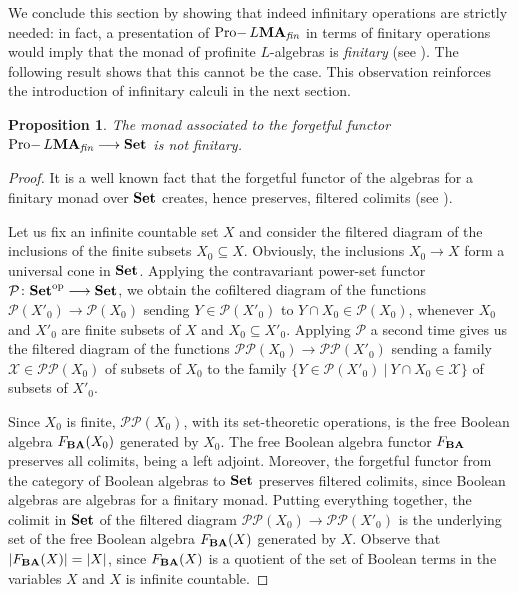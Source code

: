 \documentclass{article}
\newtheorem{prop}{Proposition}
\theoremstyle{definition}
\DeclareMathOperator{\Pro}{Pro-}
\newcommand{\MA}{\textup{\textbf{MA}}}
\newcommand{\BA}{\textup{\textbf{BA}}}
\newcommand{\fin}{\textit{fin}}
\newcommand{\op}{\textup{op}}
\newcommand{\Set}{\textup{\textbf{Set}}}
\begin{document}
We conclude this section by showing that indeed infinitary operations are strictly needed: in fact, a presentation of $\Pro L\MA_\fin$ in terms of finitary operations would imply that the monad of profinite $L$-algebras is \textit{finitary} (see \cite{AR}). The following result shows that this cannot be the case. This observation reinforces the introduction of infinitary calculi in the next section.
\begin{prop}
The monad associated to the forgetful functor $\Pro L\MA_\fin \longrightarrow \Set$ is not finitary.
\end{prop}
\begin{proof}
It is a well known fact that the forgetful functor of the algebras for a finitary monad over $\Set$ creates, hence preserves, filtered colimits (see \cite[\S 2.7]{AR}).

Let us fix an infinite countable set $X$ and consider the filtered diagram of the inclusions of the finite subsets $X_0 \subseteq X$. Obviously, the inclusions $X_0 \longrightarrow X$ form a universal cone in $\Set$. Applying the contravariant power-set functor $\mathcal{P} \colon \Set^\op \longrightarrow \Set$, we obtain the cofiltered diagram of the functions $\mathcal{P}(X'_0) \longrightarrow \mathcal{P}(X_0)$ sending $Y \in \mathcal{P}(X'_0)$ to $Y \cap X_0 \in \mathcal{P}(X_0)$, whenever $X_0$ and $X'_0$ are finite subsets of $X$ and $X_0 \subseteq X'_0$. Applying $\mathcal{P}$ a second time gives us the filtered diagram of the functions $\mathcal{P} \mathcal{P} (X_0) \longrightarrow \mathcal{P} \mathcal{P} (X'_0)$ sending a family $\mathscr{X} \in \mathcal{P} \mathcal{P}(X_0)$ of subsets of $X_0$ to the family $\{Y \in \mathcal{P}(X'_0)\ \vert\ Y \cap X_0 \in \mathscr{X}\}$ of subsets of $X'_0$.

Since $X_0$ is finite, $\mathcal{P} \mathcal{P}(X_0)$, with its set-theoretic operations, is the free Boolean algebra $F_{\BA}(X_0)$ generated by $X_0$. The free Boolean algebra functor $F_{\BA}$ preserves all colimits, being a left adjoint. Moreover, the forgetful functor from the category of Boolean algebras to $\Set$ preserves filtered colimits, since Boolean algebras are algebras for a finitary monad. Putting everything together, the colimit in $\Set$ of the filtered diagram $\mathcal{P} \mathcal{P} (X_0) \longrightarrow \mathcal{P} \mathcal{P} (X'_0)$ is the underlying set of the free Boolean algebra $F_{\BA}(X)$ generated by $X$. Observe that $|F_{\BA}(X)| = |X|$, since $F_{\BA}(X)$ is a quotient of the set of Boolean terms in the variables $X$ and $X$ is infinite countable.


\end{proof}
\end{document}
